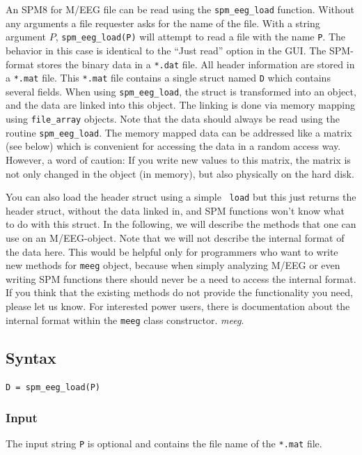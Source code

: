 An SPM8 for M/EEG file can be read using the \texttt{spm\_eeg\_load} function. Without any arguments a file requester asks for the name of the file. With a string argument $P$, \texttt{spm\_eeg\_load(P)} will attempt to read a file with the name \texttt{P}. The behavior in this case is identical to the ``Just read'' option in the GUI. The SPM-format stores the binary data in a \texttt{*.dat} file. All header information are stored in a \texttt{*.mat} file. This \texttt{*.mat} file contains a single struct named \texttt{D} which contains several fields. When using \texttt{spm\_eeg\_load}, the struct is transformed into an object, and the data are linked into this object. The linking is done via memory mapping using \texttt{file\_array} objects. Note that the data should always be read using the routine \texttt{spm\_eeg\_load}. The memory mapped data can be addressed like a matrix (see below) which is convenient for accessing the data in a random access way. However, a word of caution: If you write new values to this matrix, the matrix is not only changed in the object (in memory), but also physically on the hard disk.

You can also load the header struct using a simple \matlab\ \texttt{load} but this just returns the header struct, without the data linked in, and SPM functions won't know what to do with this struct. In the following, we will describe the methods that one can use on an M/EEG-object. Note that we will not describe the internal format of the data here. This would be helpful only for programmers who want to write new methods for \texttt{meeg} object, because when simply analyzing M/EEG or even writing SPM functions there should never be a need to access the internal format. If you think that the existing methods do not provide the functionality you need, please let us know. For interested power users, there is documentation about the internal format within the \texttt{meeg} class constructor.
\textit{meeg}.

\subsection{Syntax}
\texttt{D = spm\_eeg\_load(P)}
\\

\subsubsection{Input}
The input string \texttt{P} is optional and contains the file name of the \texttt{*.mat} file.

